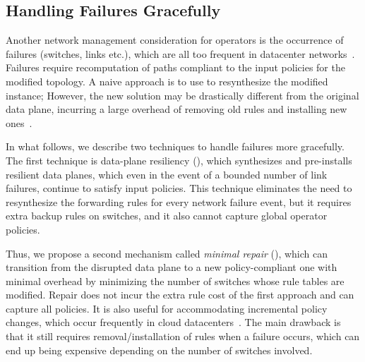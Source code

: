 \subsection{Handling Failures Gracefully}

Another network management consideration for operators is the
occurrence of failures (switches, links etc.), which are all too
frequent in datacenter networks~\cite{datacenterfailures}. Failures require
recomputation of paths compliant to the input policies
for the modified topology.  A naive approach is to use \name to
resynthesize the modified instance; However, the new solution may be
drastically different from the original data plane, incurring a large
overhead of removing old rules and installing new
ones~\cite{sdnlatency,updatescheduling}. 


In what follows, we describe two techniques to handle failures more
gracefully. The first technique is data-plane resiliency (),
which synthesizes and
pre-installs resilient data planes, which even in the event of a
bounded number of link failures, continue to satisfy input
policies. This technique eliminates the need to resynthesize the
forwarding rules for every network failure event, but it 
requires extra backup rules on switches, and it also cannot
capture global operator policies.

Thus, we propose a second mechanism called \emph{minimal repair} (),
which can transition from the disrupted data
plane to a new policy-compliant one with minimal overhead
 by minimizing the number of
switches whose rule tables are modified. 
Repair does not incur the extra rule cost of the first approach 
and can capture all \Name policies. It is also useful for 
accommodating incremental policy changes, which occur frequently in
cloud datacenters~\cite{mpa-imc15}. The main drawback is that it still
requires removal/installation of rules when a failure occurs, which
can end up being expensive depending on the number of switches
involved.





